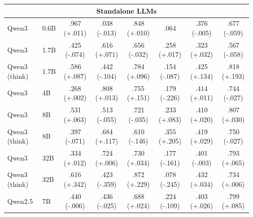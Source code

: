 \begin{table}[h]
{\begin{tabular}{ll@{\hspace{2pt}}cc@{\hspace{6pt}}cc@{\hspace{6pt}}cc}
\midrule
\multicolumn{8}{c}{\textbf{Standalone LLMs}} \\
\midrule
Qwen3 & 0.6B & .967 {(\textcolor[HTML]{CC7A00}{+.011})} & .038 {(\textcolor[HTML]{0072B2}{-.013})} & .848 {(\textcolor[HTML]{CC7A00}{+.010})} & .064 & .376 {(\textcolor[HTML]{0072B2}{-.005})} & .677 {(\textcolor[HTML]{0072B2}{-.059})} \\
Qwen3 & 1.7B & .425 {(\textcolor[HTML]{0072B2}{-.074})} & .616 {(\textcolor[HTML]{CC7A00}{+.071})} & .656 {(\textcolor[HTML]{0072B2}{-.032})} & .258 {(\textcolor[HTML]{CC7A00}{+.017})} & .323 {(\textcolor[HTML]{CC7A00}{+.032})} & .567 {(\textcolor[HTML]{0072B2}{-.058})} \\
Qwen3 (think) & 1.7B & .586 {(\textcolor[HTML]{CC7A00}{+.087})} & .442 {(\textcolor[HTML]{0072B2}{-.104})} & .784 {(\textcolor[HTML]{CC7A00}{+.096})} & .154 {(\textcolor[HTML]{0072B2}{-.087})} & .425 {(\textcolor[HTML]{CC7A00}{+.134})} & .818 {(\textcolor[HTML]{CC7A00}{+.193})} \\
Qwen3 & 4B & .268 {(\textcolor[HTML]{CC7A00}{+.002})} & .808 {(\textcolor[HTML]{CC7A00}{+.013})} & .755 {(\textcolor[HTML]{CC7A00}{+.151})} & .179 {(\textcolor[HTML]{0072B2}{-.226})} & .414 {(\textcolor[HTML]{CC7A00}{+.011})} & .744 {(\textcolor[HTML]{0072B2}{-.027})} \\
Qwen3 & 8B & .531 {(\textcolor[HTML]{CC7A00}{+.063})} & .513 {(\textcolor[HTML]{0072B2}{-.055})} & .721 {(\textcolor[HTML]{0072B2}{-.035})} & .233 {(\textcolor[HTML]{CC7A00}{+.083})} & .410 {(\textcolor[HTML]{CC7A00}{+.020})} & .807 {(\textcolor[HTML]{CC7A00}{+.030})} \\
Qwen3 (think) & 8B & .397 {(\textcolor[HTML]{0072B2}{-.071})} & .684 {(\textcolor[HTML]{CC7A00}{+.117})} & .610 {(\textcolor[HTML]{0072B2}{-.146})} & .355 {(\textcolor[HTML]{CC7A00}{+.205})} & .419 {(\textcolor[HTML]{CC7A00}{+.029})} & .750 {(\textcolor[HTML]{0072B2}{-.027})} \\
Qwen3 & 32B & .334 {(\textcolor[HTML]{CC7A00}{+.012})} & .724 {(\textcolor[HTML]{CC7A00}{+.006})} & .730 {(\textcolor[HTML]{CC7A00}{+.034})} & .177 {(\textcolor[HTML]{0072B2}{-.161})} & .401 {(\textcolor[HTML]{0072B2}{-.003})} & .793 {(\textcolor[HTML]{CC7A00}{+.065})} \\
Qwen3 (think) & 32B & .616 {(\textcolor[HTML]{CC7A00}{+.342})} & .423 {(\textcolor[HTML]{0072B2}{-.359})} & .872 {(\textcolor[HTML]{CC7A00}{+.229})} & .078 {(\textcolor[HTML]{0072B2}{-.245})} & .432 {(\textcolor[HTML]{CC7A00}{+.034})} & .734 {(\textcolor[HTML]{CC7A00}{+.006})} \\
Qwen2.5 & 7B & .440 {(\textcolor[HTML]{0072B2}{-.006})} & .436 {(\textcolor[HTML]{0072B2}{-.025})} & .688 {(\textcolor[HTML]{CC7A00}{+.024})} & .224 {(\textcolor[HTML]{0072B2}{-.109})} & .403 {(\textcolor[HTML]{CC7A00}{+.026})} & .799 {(\textcolor[HTML]{CC7A00}{+.085})} \\

\end{tabular}}
\end{table}
